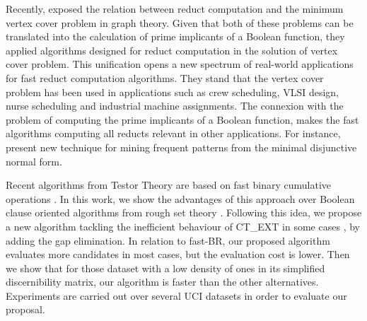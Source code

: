 \documentclass[authoryear,preprint,review,12pt]{elsarticle}
\begin{document}
  Recently, \cite{chen2015} exposed the relation between reduct computation and the minimum vertex cover
  problem in graph theory. Given that both of these problems can be translated into the calculation of
  prime implicants of a Boolean function, they applied algorithms designed for reduct computation in the
  solution of vertex cover problem. This unification opens a new spectrum of real-world applications for 
  fast reduct computation algorithms. They stand that the vertex cover problem has been used in applications 
  such as crew scheduling, VLSI design, nurse scheduling and industrial machine assignments.
  The connexion with the problem of computing the prime implicants of a Boolean function, makes the fast 
  algorithms computing all reducts relevant in other applications. For instance,\cite{Li2015} present 
  new technique for mining frequent patterns from the minimal disjunctive normal form.

  Recent algorithms from Testor Theory are based on fast binary cumulative operations \citep{Sanchez10,Lias13}.
  In this work, we show the advantages of this approach over Boolean clause oriented algorithms from rough
  set theory \citep{WangP07,Jensen14}. Following this idea, we propose a new algorithm tackling the inefficient
  behaviour of CT\_EXT in some cases \citep{Alba14}, by adding the gap elimination. In relation to fast-BR, our 
  proposed algorithm evaluates more candidates in most cases, but the evaluation cost is lower. Then we show 
  that for those dataset with a low density of ones in its simplified discernibility matrix, our algorithm is 
  faster than the other alternatives. Experiments are carried out over several UCI datasets \citep{Bache13} in 
  order to evaluate our proposal.
  
  
\end{document}
